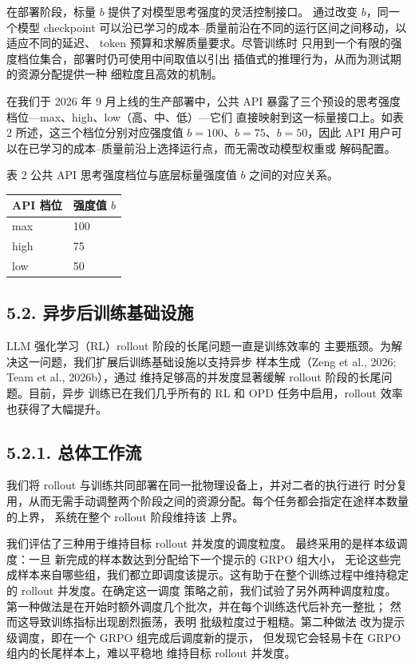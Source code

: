 在部署阶段，标量 $b$ 提供了对模型思考强度的灵活控制接口。
通过改变 $b$，同一个模型 checkpoint 可以沿已学习的成本--质量前沿在不同的运行区间之间移动，以适应不同的延迟、
token 预算和求解质量要求。尽管训练时
只用到一个有限的强度档位集合，部署时仍可使用中间取值以引出
插值式的推理行为，从而为测试期的资源分配提供一种
细粒度且高效的机制。

在我们于 2026 年 9 月上线的生产部署中，公共 API
暴露了三个预设的思考强度档位---max、high、low（高、中、低）---它们
直接映射到这一标量接口上。如表 2 所述，这三个档位分别对应强度值 $b = 100$、$b = 75$、$b = 50$，因此 API 用户可以在已学习的成本--质量前沿上选择运行点，而无需改动模型权重或
解码配置。

表 2 \textbar{} 公共 API 思考强度档位与底层标量强度值 $b$ 之间的对应关系。

{\def\LTcaptype{none} %
\begin{longtable}[]{@{}|l|l|@{}}
\toprule\noalign{}
\endhead
\bottomrule\noalign{}
\endlastfoot
\hline
API 档位 & 强度值 $b$ \\
\hline
max & 100 \\
\hline
high & 75 \\
\hline
low & 50 \\
\hline
\end{longtable}
}

\subsection{5.2. 异步后训练基础设施}\label{asynchronous-post-training-infrastructure}

LLM 强化学习（RL）rollout 阶段的长尾问题一直是训练效率的
主要瓶颈。为解决这一问题，我们扩展后训练基础设施以支持异步
样本生成（Zeng et al., 2026; Team et al., 2026b），通过
维持足够高的并发度显著缓解 rollout 阶段的长尾问题。目前，异步
训练已在我们几乎所有的 RL 和 OPD 任务中启用，rollout
效率也获得了大幅提升。

\subsection{5.2.1. 总体工作流}\label{overall-workflow}

我们将 rollout 与训练共同部署在同一批物理设备上，并对二者的执行进行
时分复用，从而无需手动调整两个阶段之间的资源分配。每个任务都会指定在途样本数量的上界，
系统在整个 rollout 阶段维持该
上界。

我们评估了三种用于维持目标 rollout 并发度的调度粒度。
最终采用的是样本级调度：一旦
新完成的样本数达到分配给下一个提示的 GRPO 组大小，
无论这些完成样本来自哪些组，我们都立即调度该提示。这有助于在整个训练过程中维持稳定的 rollout
并发度。在确定这一调度
策略之前，我们试验了另外两种调度粒度。
第一种做法是在开始时额外调度几个批次，并在每个训练迭代后补充一整批；
然而这导致训练指标出现剧烈振荡，表明
批级粒度过于粗糙。第二种做法
改为提示级调度，即在一个 GRPO 组完成后调度新的提示，
但发现它会轻易卡在 GRPO 组内的长尾样本上，难以平稳地
维持目标 rollout 并发度。

